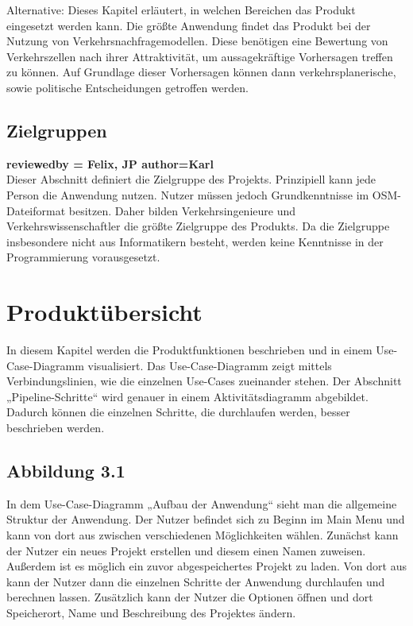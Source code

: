 \documentclass[parskip=full]{scrartcl} %
\begin{document}
Alternative:
Dieses Kapitel erläutert, in welchen Bereichen das Produkt eingesetzt werden kann. Die größte Anwendung findet das Produkt bei der Nutzung von Verkehrsnachfragemodellen. Diese benötigen eine Bewertung von Verkehrszellen nach ihrer Attraktivität, um aussagekräftige Vorhersagen treffen zu können. Auf Grundlage dieser Vorhersagen können dann verkehrsplanerische, sowie politische Entscheidungen getroffen werden.


\subsection{Zielgruppen}
\textbf{reviewedby = Felix, JP author=Karl\\}
Dieser Abschnitt definiert die Zielgruppe des Projekts. Prinzipiell kann jede Person die Anwendung nutzen. Nutzer müssen jedoch Grundkenntnisse im OSM-Dateiformat besitzen. Daher bilden Verkehrsingenieure und Verkehrswissenschaftler die größte Zielgruppe des Produkts. Da die Zielgruppe insbesondere nicht aus Informatikern besteht, werden keine Kenntnisse in der Programmierung vorausgesetzt.
\newpage







\section{Produktübersicht}
In diesem Kapitel werden die Produktfunktionen beschrieben und in einem Use-Case-Diagramm visualisiert. Das Use-Case-Diagramm zeigt mittels Verbindungslinien, wie die einzelnen Use-Cases zueinander stehen. Der Abschnitt „Pipeline-Schritte“ wird genauer in einem Aktivitätsdiagramm abgebildet. Dadurch können die einzelnen Schritte, die durchlaufen werden, besser beschrieben werden.

\subsection{Abbildung 3.1}
In dem Use-Case-Diagramm „Aufbau der Anwendung“ sieht man die allgemeine Struktur der Anwendung. Der Nutzer befindet sich zu Beginn im Main Menu und kann von dort aus zwischen verschiedenen Möglichkeiten wählen.
Zunächst kann der Nutzer ein neues Projekt erstellen und diesem einen Namen zuweisen. Außerdem ist es möglich ein zuvor abgespeichertes Projekt zu laden. Von dort aus kann der Nutzer dann die einzelnen Schritte der Anwendung durchlaufen und berechnen lassen. 
Zusätzlich kann der Nutzer die Optionen öffnen und dort Speicherort, Name und Beschreibung des Projektes ändern.
\end{document}
